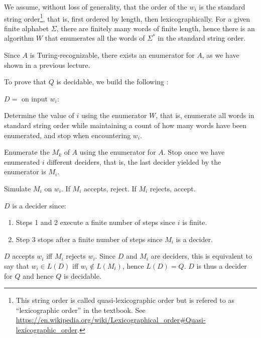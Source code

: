 We assume,
without loss of generality, that the order of the \(w_i\) is the standard
string order\footnote{%
This string order is called quasi-lexicographic order but is refered to as
``lexicographic order'' in the textbook. See
\url{https://en.wikipedia.org/wiki/Lexicographical\_order\#Quasi-lexicographic\_order}.
}, that is, first ordered by length, then lexicographically.
For a given finite alphabet \(\Sigma\), there are finitely many words of finite
length, hence there is an algorithm \(W\) that enumerates all the words of \(\Sigma^*\)
in the standard string order.

Since \(A\) is Turing-recognizable, there exists an enumerator
for \(A\), as we have shown in a previous lecture.

To prove that \(Q\) is decidable, we build the following \TM{}:

\begin{TMachine}{\(D =\) on input \(w_i\):}
\item[1.] Determine the value of \(i\) using the enumerator \(W\), that is,
enumerate all words in standard string order while maintaining a count of how
many words have been enumerated, and stop when encountering \(w_i\).
\item[2.] Enumerate the \(M_k\) of \(A\) using the enumerator for \(A\). Stop once
we have enumerated \(i\) different deciders, that is, the last decider yielded
by the enumerator is \(M_i\).
\item[3.] Simulate \(M_i\) on \(w_i\). If \(M_i\) accepts, reject. If \(M_i\) rejects, accept.
\end{TMachine}

\(D\) is a decider since:
\begin{enumerate}
\item Steps 1 and 2 execute a finite number of steps since \(i\) is finite.
\item Step 3 stops after a finite number of steps since \(M_i\) is a decider.
\end{enumerate}

\(D\) accepts \(w_i\) iff \(M_i\) rejects \(w_i\). Since \(D\) and \(M_i\) are
deciders, this is equivalent to say
that \(w_i \in L(D)\) iff \(w_i \not\in L(M_i)\), hence \(L(D) = Q\).
\(D\) is thus a decider for \(Q\) and hence \(Q\) is decidable.

